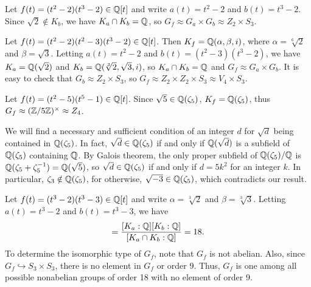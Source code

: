 \begin{exmp}
    Let $f(t)=(t^2-2)(t^3-2)\in{\mathbb{Q}}[t]$ and write $a(t)=t^2-2$ and $b(t)=t^3-2$.
    Since $\sqrt{2}\notin K_b$, we have $K_a\cap K_b={\mathbb{Q}}$, so $G_f\approx G_a\times G_b\approx Z_2\times S_3$.
\end{exmp}
\begin{exmp}
    Let $f(t)=(t^2-2)(t^2-3)(t^3-2)\in{\mathbb{Q}}[t]$.
    Then $K_f={\mathbb{Q}}(\alpha, \beta, i)$, where $\alpha=\sqrt[6]{2}$ and $\beta=\sqrt{3}$.
    Letting $a(t)=t^2-2$ and $b(t)=(t^2-3)(t^3-2)$, we have $K_a={\mathbb{Q}}(\sqrt{2})$ and $K_b={\mathbb{Q}}(\sqrt[3]{2}, \sqrt{3}, i)$, so $K_a\cap K_b={\mathbb{Q}}$ and $G_f\approx G_a\times G_b$.
    It is easy to check that $G_b\approx Z_2\times S_3$, so $G_f\approx Z_2\times Z_2\times S_3\approx V_4\times S_3$.
\end{exmp}
\begin{exmp}
    Let $f(t)=(t^2-5)(t^5-1)\in{\mathbb{Q}}[t]$.
    Since $\sqrt{5}\in{\mathbb{Q}}(\zeta_5)$, $K_f={\mathbb{Q}}(\zeta_5)$, thus $G_f\approx({\mathbb{Z}}/5{\mathbb{Z}})^\times\approx Z_4$.
\end{exmp}
\begin{exmp}
    We will find a necessary and sufficient condition of an integer $d$ for $\sqrt{d}$ being contained in ${\mathbb{Q}}(\zeta_5)$.
    In fact, $\sqrt{d}\in{\mathbb{Q}}(\zeta_5)$ if and only if ${\mathbb{Q}}(\sqrt{d})$ is a subfield of ${\mathbb{Q}}(\zeta_5)$ containing ${\mathbb{Q}}$.
    By Galois theorem, the only proper subfield of ${\mathbb{Q}}(\zeta_5)/{\mathbb{Q}}$ is ${\mathbb{Q}}(\zeta_5+\zeta_5^{-1})={\mathbb{Q}}(\sqrt{5})$, so $\sqrt{d}\in{\mathbb{Q}}(\zeta_5)$ if and only if $d=5k^2$ for an integer $k$.
    In particular, $\zeta_3\notin{\mathbb{Q}}(\zeta_5)$, for otherwise, $\sqrt{-3}\in{\mathbb{Q}}(\zeta
    _5)$, which contradicts our result.
\end{exmp}
\color{blue}
\begin{exmp}
    Let $f(t)=(t^3-2)(t^3-3)\in{\mathbb{Q}}[t]$ and write $\alpha=\sqrt[3]{2}$ and $\beta=\sqrt[3]{3}$.
    Letting $a(t)=t^3-2$ and $b(t)=t^3-3$, we have
    \begin{align*}
        [K_f: \bb{Q}]=\frac{[K_a: \bb{Q}][K_b: \bb{Q}]}{[K_a\cap K_b: \bb{Q}]}=18.
    \end{align*}
    To determine the isomorphic type of $G_f$, note that $G_f$ is not abelian.
    Also, since $G_f\hookrightarrow S_3\times S_3$, there is no element in $G_f$ or order 9.
    Thus, $G_f$ is one among all possible nonabelian groups of order 18 with no element of order 9.
\end{exmp}
\color{black}